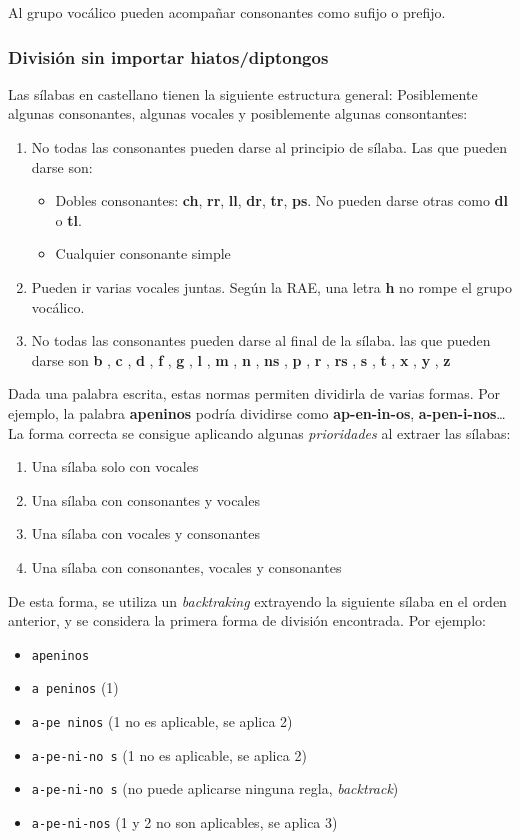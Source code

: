 \documentclass[11pt]{article}
\begin{document}
Al grupo vocálico pueden acompañar consonantes como sufijo o prefijo.

\subsubsection{División sin importar hiatos/diptongos}
\label{sec:org0000003}
Las sílabas en castellano tienen la siguiente estructura general: Posiblemente algunas consonantes, algunas vocales y posiblemente algunas consontantes:
\begin{enumerate}
\item No todas las consonantes pueden darse al principio de sílaba. Las que pueden darse son:
\begin{itemize}
\item Dobles consonantes: \textbf{ch}, \textbf{rr}, \textbf{ll}, \textbf{dr}, \textbf{tr}, \textbf{ps}. No pueden darse otras como \textbf{dl} o \textbf{tl}.
\item Cualquier consonante simple
\end{itemize}
\item Pueden ir varias vocales juntas. Según la RAE, una letra \textbf{h} no rompe el grupo vocálico.
\item No todas las consonantes pueden darse al final de la sílaba. las que pueden darse son \textbf{b} , \textbf{c} , \textbf{d} , \textbf{f} , \textbf{g} , \textbf{l} , \textbf{m} , \textbf{n} , \textbf{ns} , \textbf{p} , \textbf{r} , \textbf{rs} , \textbf{s} , \textbf{t} , \textbf{x} , \textbf{y} , \textbf{z}
\end{enumerate}

Dada una palabra escrita, estas normas permiten dividirla de varias formas. Por ejemplo, la palabra \textbf{apeninos} podría dividirse como \textbf{ap-en-in-os}, \textbf{a-pen-i-nos}\ldots{} La forma correcta se consigue aplicando algunas \emph{prioridades} al extraer las sílabas:
\begin{enumerate}
\item Una sílaba solo con vocales
\item Una sílaba con consonantes y vocales
\item Una sílaba con vocales y consonantes
\item Una sílaba con consonantes, vocales y consonantes
\end{enumerate}

De esta forma, se utiliza un \emph{backtraking} extrayendo la siguiente sílaba en el orden anterior, y se considera la primera forma de división encontrada. Por ejemplo:
\begin{itemize}
\item \texttt{apeninos}
\item \texttt{a peninos} (1)
\item \texttt{a-pe ninos} (1 no es aplicable, se aplica 2)
\item \texttt{a-pe-ni-no s} (1 no es aplicable, se aplica 2)
\item \texttt{a-pe-ni-no s} (no puede aplicarse ninguna regla, \emph{backtrack})
\item \texttt{a-pe-ni-nos} (1 y 2 no son aplicables, se aplica 3)
\end{itemize}
\end{document}
